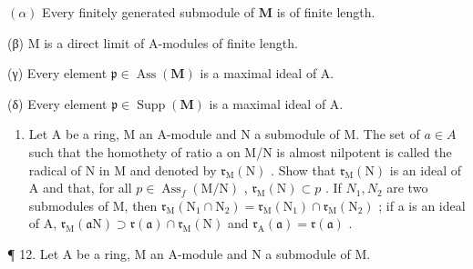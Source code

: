 \((\alpha)\) Every finitely generated submodule of \(\mathbf{M}\) is of finite length.

(β) M is a direct limit of A-modules of finite length.

(γ) Every element \(\mathfrak{p} \in \operatorname{Ass}(\mathbf{M})\) is a maximal ideal of A.

(δ) Every element \(\mathfrak{p} \in \operatorname{Supp}(\mathbf{M})\) is a maximal ideal of A.

\begin{enumerate}
\def\labelenumi{\arabic{enumi}.}
\setcounter{enumi}{10}
\tightlist
\item
  Let A be a ring, M an A-module and N a submodule of M. The set of \(a \in A\) such that the homothety of ratio a on M/N is almost nilpotent is called the radical of N in M and denoted by \(\mathfrak{r}_{\mathrm{M}}(\mathrm{N})\) . Show that \(\mathfrak{r}_{\mathrm{M}}(\mathrm{N})\) is an ideal of A and that, for all \(p \in \operatorname{Ass}_{f}(\mathrm{M}/\mathrm{N})\) , \(\mathfrak{r}_{\mathrm{M}}(\mathrm{N}) \subset p\) . If \(N_{1}, N_{2}\) are two submodules of M, then \(\mathfrak{r}_{\mathrm{M}}(\mathrm{N}_{1} \cap \mathrm{N}_{2}) = \mathfrak{r}_{\mathrm{M}}(\mathrm{N}_{1}) \cap \mathfrak{r}_{\mathrm{M}}(\mathrm{N}_{2})\) ; if a is an ideal of A, \(\mathfrak{r}_{\mathrm{M}}(\mathfrak{a}\mathrm{N}) \supset \mathfrak{r}(\mathfrak{a}) \cap \mathfrak{r}_{\mathrm{M}}(\mathrm{N})\) and \(\mathfrak{r}_{\mathrm{A}}(\mathfrak{a}) = \mathfrak{r}(\mathfrak{a})\) .
\end{enumerate}

¶ 12. Let A be a ring, M an A-module and N a submodule of M.

